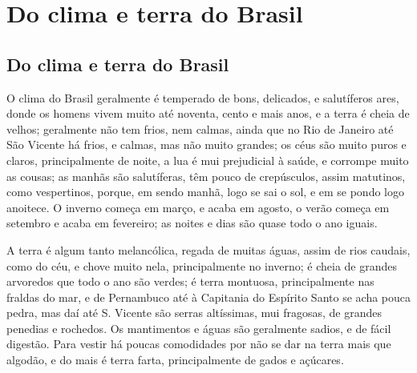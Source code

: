 
\newcommand{\especie}[1]{\textsc{#1}\index{#1}}

\chapter[Do clima e terra do Brasil e de algumas cousas notáveis que
se acham na terra como no mar]{Do clima e terra do Brasil}



\section{Do clima e terra do Brasil}
O clima do Brasil geralmente é temperado de bons, delicados, e
salutíferos ares, donde os homens vivem muito até noventa, cento e
mais anos, e a terra é cheia de velhos; geralmente não tem frios, nem
calmas, ainda que no Rio de Janeiro até São Vicente há frios, e calmas,
mas não muito grandes; os céus são muito puros e claros,
principalmente de noite, a lua é mui prejudicial à saúde, e corrompe
muito as cousas; as manhãs são salutíferas, têm pouco de crepúsculos,
assim matutinos, como vespertinos, porque, em sendo manhã, logo se sai
o sol, e em se pondo logo anoitece. O inverno começa em março, e acaba
em agosto, o verão começa em setembro e acaba em fevereiro; as noites e
dias são quase todo o ano iguais. 

 A terra é algum tanto melancólica, regada de muitas águas, assim de
rios caudais, como do céu, e chove muito nela, principalmente no
inverno; é cheia de grandes arvoredos que todo o ano são verdes; é
terra montuosa, principalmente nas fraldas do mar, e de Pernambuco até
à Capitania do Espírito Santo se acha pouca pedra, mas daí até S.
Vicente são serras altíssimas, mui fragosas, de grandes penedias e
rochedos. Os mantimentos e águas são geralmente sadios, e de fácil
digestão. Para vestir há poucas comodidades por não se dar na terra
mais que algodão, e do mais é terra farta, principalmente de gados e
açúcares. 

